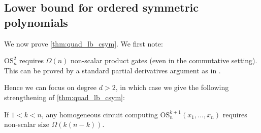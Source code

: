 \documentclass[10pt,a4paper]{article}
\newcommand{\esym}[2]{\mathrm{OS}_{#1}^{#2}}
\begin{document}
\subsection{Lower bound for ordered symmetric polynomials}

We now prove \autoref{thm:quad_lb_csym}. We first note: 

\begin{remark}\label{rem:standard} 
  $\esym{n}{2}$ requires $\Omega(n)$ non-scalar product gates (even in the commutative setting). 
  This can be proved by a standard partial derivatives argument as in \cite{NW97}. 
\end{remark}

Hence we can focus on degree $d>2$, in which case we give the following strengthening of \autoref{thm:quad_lb_csym}:

\begin{theorem}\label{thm:esym}
  If $1<k < n $, any homogeneous circuit computing $\esym{n}{k+1}(x_1,\dots,x_n)$
  requires  non-scalar size $\Omega(k(n-k))$.
\end{theorem}
\end{document}
